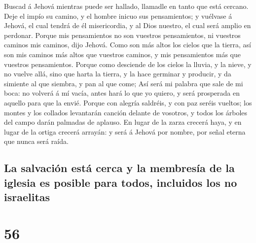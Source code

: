  Buscad á Jehová mientras puede ser hallado, llamadle en
tanto que está cercano.  Deje el impío su camino, y el
hombre inicuo sus pensamientos; y vuélvase á Jehová, el cual tendrá de
él misericordia, y al Dios nuestro, el cual será amplio en perdonar.
 Porque mis pensamientos no son vuestros pensamientos, ni
vuestros caminos mis caminos, dijo Jehová.  Como son más
altos los cielos que la tierra, así son mis caminos más altos que
vuestros caminos, y mis pensamientos más que vuestros pensamientos.
 Porque como desciende de los cielos la lluvia, y la nieve,
y no vuelve allá, sino que harta la tierra, y la hace germinar y
producir, y da simiente al que siembra, y pan al que come; 
Así será mi palabra que sale de mi boca: no volverá á mí vacía, antes
hará lo que yo quiero, y será prosperada en aquello para que la envié.
 Porque con alegría saldréis, y con paz seréis vueltos; los
montes y los collados levantarán canción delante de vosotros, y todos
los árboles del campo darán palmadas de aplauso.  En lugar
de la zarza crecerá haya, y en lugar de la ortiga crecerá arrayán: y
será á Jehová por nombre, por señal eterna que nunca será raída.

\hypertarget{la-salvaciuxf3n-estuxe1-cerca-y-la-membresuxeda-de-la-iglesia-es-posible-para-todos-incluidos-los-no-israelitas}{%
\subsection{La salvación está cerca y la membresía de la iglesia es
posible para todos, incluidos los no
israelitas}\label{la-salvaciuxf3n-estuxe1-cerca-y-la-membresuxeda-de-la-iglesia-es-posible-para-todos-incluidos-los-no-israelitas}}

\hypertarget{section-55}{%
\section{56}\label{section-55}}

